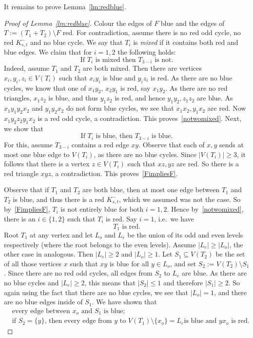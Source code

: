 \documentclass[a4paper, 12pt]{article}
\numberwithin{equation}{section}
\def\sm{{\setminus}}
\begin{document}
It remains to prove Lemma~\ref{lm:redblue}.

\begin{proof}[Proof of Lemma~\ref{lm:redblue}] 
Colour the edges of $F$ blue and the edges of $T:=(T_1+T_2)\setminus F$ red. For contradiction, assume there is no red odd cycle, no red $K_{s,t}^-$ and no blue cycle. 
We say that $T_i$ is {\it mixed} if it contains both red and blue edges. We claim that for $i=1,2$ the following holds:
\begin{equation}\label{notwomixed}
    \text{If $T_i$ is mixed then $T_{3-i}$ is not.}
\end{equation}
Indeed, assume $T_1$ and $T_2$ are both mixed. Then there are vertices $x_i, y_i, z_i\in V(T_i)$ such that $x_iy_i$ is blue and $y_iz_i$ is red. As there are no blue cycles, we know that one of $x_1y_2$, $x_2y_1$ is red, say  $x_1y_2$. As there are no red triangles, $x_1z_2$ is blue, and thus $y_1z_2$ is red, and hence $y_1y_2, z_1z_2$ are blue. As $x_1y_1y_2x_2$ and $y_1y_2x_2$ do not form blue cycles, we see that $x_1x_2, y_1x_2$ are red. Now $x_1y_2z_2y_1x_2$ is a red odd cycle, a contradiction. This proves~\eqref{notwomixed}.
Next, we show that
\begin{equation}\label{FimpliesF}
    \text{If $T_i$ is blue, then $T_{3-i}$ is blue.}
\end{equation}
For this, assume $T_{3-i}$ contains a red edge $xy$. Observe that  each of $x,y$ sends at most one blue edge to $V(T_i)$, as there are no blue cycles. Since $|V(T_i)|\ge 3$, it follows that there is a vertex $z\in V(T_i)$ such that $xz, yz$ are red. So there is a red triangle $xyz$, a contradiction. This proves~\eqref{FimpliesF}.

Observe that if $T_1$ and $T_2$ are both blue, then at most one edge between $T_1$ and $T_2$ is blue, and thus there is a red $K_{s,t}^-$, which we assumed was not the case. So by~\eqref{FimpliesF},   $T_i$ is not entirely blue for both $i=1,2$. Hence by~\eqref{notwomixed}, there is an $i\in\{1,2\}$ such that $T_i$ is red. Say $i=1$, i.e.~we have
\begin{equation}\label{T1inT}
    T_1 \text{ is red}.
\end{equation}
Root $T_1$ at any vertex and let $L_o$ and $L_e$ be the union of its odd and even levels respectively (where the root belongs to the even levels). Assume $|L_e|\ge |L_o|$, the other case in analogous. Then $|L_e|\ge 2$ and $|L_o|\ge 1$.
Let $S_1\subseteq V(T_2)$ be the set of all those vertices $x$ such that $xy$ is blue for all $y \in L_o$, and set $S_2:= V(T_2)\setminus S_1$. Since there are no red odd cycles, all edges from $S_2$ to $L_e$ are blue. 
As there are no blue cycles and $|L_e|\ge 2$, this means that $|S_2|\le 1$ and therefore $|S_1|\ge 2$. So again using the fact that there are no blue cycles, we see that $|L_o|=1$, and there are no blue edges inside of $S_1$.
We have shown that 
\begin{align}
\label{eq:join1}    
&\text{every edge between $x_o$ and $S_1$ is blue};\\
\label{eq:join2}
&\text{if $S_2=\{y\}$, then every edge from $y$ to $V(T_1) \sm \{x_o\} = L_e$
    is blue and $yx_o$ is red.}
\end{align}


\end{proof}
\end{document}
